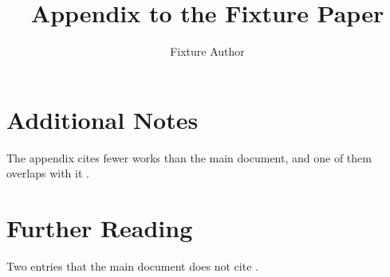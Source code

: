 \documentclass[11pt]{article}
\title{Appendix to the Fixture Paper}
\author{Fixture Author}
\date{}
\begin{document}
\maketitle

\section{Additional Notes}
The appendix cites fewer works than the main document, and one of them
overlaps with it \cite{paszkePyTorchImperativeStyle2019}.

\section{Further Reading}
Two entries that the main document does not cite
\cite{binzTOSCAPortableAutomated2014, rubinsteinSimulationMonteCarlo2017}.



\end{document}
